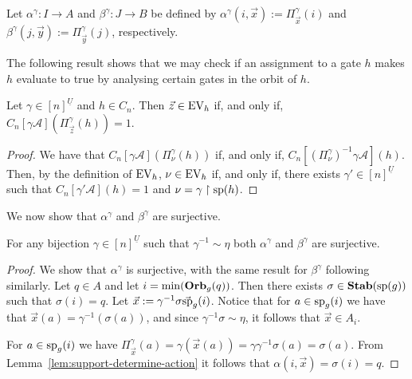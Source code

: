 \documentclass[../paper.tex]{subfiles}
\begin{document}
Let $\alpha^{\gamma}: I \rightarrow A$ and $\beta^{\gamma}: J \rightarrow B$ be
defined by $\alpha^{\gamma} (i, \vec{x}) := \Pi^{\gamma}_{\vec{x}}(i)$ and
$\beta^{\gamma} (j, \vec{y}) := \Pi^{\gamma}_{\vec{y}}(j)$, respectively.

The following result shows that we may check if an assignment to a gate $h$
makes $h$ evaluate to true by analysing certain gates in the orbit of $h$.

\begin{lem}
	Let $\gamma\in [n]^{\underline{U}}$ and $h \in C_n$. Then $\vec{z} \in \text{EV}_h$
	if, and only if, $C_n[\gamma \mathcal{A}](\Pi^{\gamma}_{\vec{z}} (h)) = 1$.
\label{lem:translate-EV-circuits}
\end{lem}
\begin{proof}
	We have that $C_n[\gamma \mathcal{A}](\Pi^{\gamma}_\nu(h))$ if, and only if,
	$C_n[(\Pi^{\gamma}_{\nu})^{-1}\gamma \mathcal{A}] (h)$. Then, by the
	definition of $\text{EV}_h$, $\nu \in \text{EV}_h$ if, and only if, there exists $\gamma'
	\in [n]^{\underline{U}}$ such that $C_n[\gamma' \mathcal{A}](h) = 1$ and $\nu
	= \gamma\restriction{\text{sp}(h)}$.
\end{proof}

We now show that $\alpha^{\gamma}$ and $\beta^{\gamma}$ are surjective.

\begin{lem} 
	For any bijection $\gamma \in [n]^{\underline{U}}$ such that $\gamma^{-1} \sim
	\eta$ both $\alpha^{\gamma}$ and $\beta^{\gamma}$ are surjective.
\label{lem:alpha-beta-surjective}
\end{lem}
\begin{proof}
	We show that $\alpha^{\gamma}$ is surjective, with the same result for
	$\beta^{\gamma}$ following similarly. Let $q \in A$ and let $i = \min
	(\text{\textbf{Orb}}_{g} (q))$. Then there exists $\sigma \in \text{\textbf{Stab}} (\text{sp} (g))$ such that $\sigma
	(i) = q$. Let $\vec{x} := \gamma^{-1} \sigma \vec{\text{sp}}_g(i)$. Notice that
	for $a \in \text{sp}_g(i)$ we have that $\vec{x}(a) = \gamma^{-1} (\sigma (a))$,
	and since $\gamma^{-1} \sigma \sim \eta$, it follows that $\vec{x} \in A_i$.
		
	For $a \in \text{sp}_g(i)$ we have $\Pi^{\gamma}_{\vec{x}} (a) = \gamma
	(\vec{x}(a)) = \gamma \gamma^{-1} \sigma (a) = \sigma (a)$. From Lemma~\ref{lem:support-determine-action} it follows that $\alpha(i, \vec{x}) =
	\sigma(i) = q$.
\end{proof}

\end{document}
